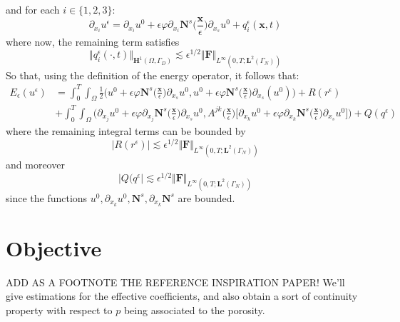 and for each $i \in \{1,2,3\}$:
\begin{equation*}
    \partial_{x_i} u^{\epsilon} = \partial_{x_i} u^0 + \epsilon \varphi \partial_{x_i} \mathbf{N}^s \big( \frac{\mathbf{x}}{\epsilon} \big) \partial_{x_s} u^0 + q^{\epsilon}_i(\mathbf{x},t)
\end{equation*}
where now, the remaining term satisfies 
\begin{equation*}
    \Vert q^{\epsilon}_i(\cdot, t) \Vert_{\mathbf{H}^1(\Omega, \Gamma_D)} \lesssim \epsilon^{1/2} \Vert \mathbf{F}\Vert_{L^{\infty}(0,T; \mathbf{L}^{2}(\Gamma_N))}
\end{equation*}
So that, using the definition of the energy operator, it follows that:
\begin{align*}
    E_{\epsilon}(u^{\epsilon}) &= \int_0^T \int_{\Omega} \frac{1}{2}(u^0 + \epsilon \varphi \mathbf{N}^s \big( \frac{\mathbf{x}}{\epsilon} \big) \partial_{x_s} u^0, u^0 + \epsilon \varphi \mathbf{N}^s \big( \frac{\mathbf{x}}{\epsilon} \big) \partial_{x_s} (u^0) \big) + R(r^{\epsilon}) \\
    & + \int_0^T \int_{\Omega} \big( \partial_{x_j} u^0 + \epsilon \varphi \partial_{x_j} \mathbf{N}^s \big( \frac{\mathbf{x}}{\epsilon} \big) \partial_{x_s} u^0, A^{jk} \big(\frac{\mathbf{x}}{\epsilon} \big) \big[\partial_{x_k} u^0 + \epsilon \varphi \partial_{x_k} \mathbf{N}^s \big( \frac{\mathbf{x}}{\epsilon}\big) \partial_{x_s} u^0 \big] \big) + Q(q^{\epsilon})
\end{align*}
where the remaining integral terms can be bounded by
\begin{equation*}
    \vert R(r^{\epsilon}) \vert \lesssim \epsilon^{1/2} \Vert \mathbf{F}\Vert_{L^{\infty}(0,T;\mathbf{L}^{2}(\Gamma_N))} 
\end{equation*}
and moreover
\begin{equation*}
    \vert Q(q^{\epsilon} \vert \lesssim \epsilon^{1/2} \Vert \mathbf{F}\Vert_{L^{\infty}(0,T;\mathbf{L}^{2}(\Gamma_N))}
\end{equation*}
since the functions $u^0, \partial_{x_k}u^0, \mathbf{N}^s, \partial_{x_k} \mathbf{N}^s$ are bounded.


\section{Objective}
ADD AS A FOOTNOTE THE REFERENCE INSPIRATION PAPER!
We'll give estimations for the effective coefficients, and also obtain a sort of continuity property with respect to $p$ being associated to the porosity.

